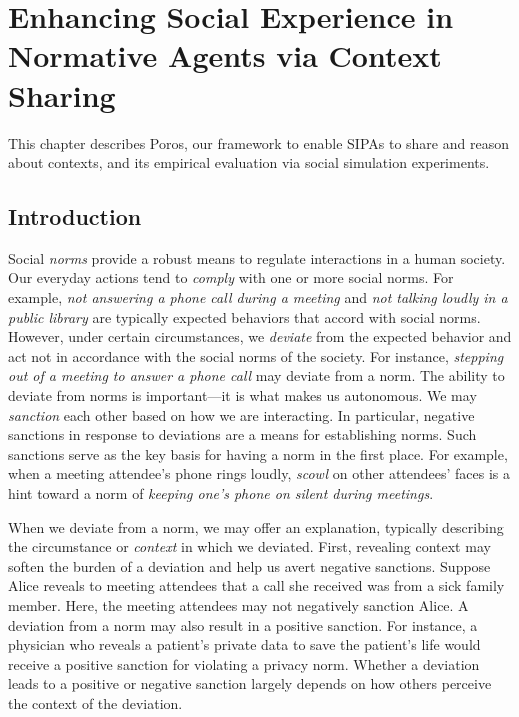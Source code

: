 \documentclass[11pt,          %
               phd,           %
               onehalfspacing %
               ]{ncsuthesis}
\newcommand{\fsl}{\textsl}
\newcommand{\frameworkB}{Poros\xspace}
\begin{document}
\chapter[Enhancing Social Experience via Context Sharing]{Enhancing Social Experience in Normative Agents via Context Sharing}
\label{chap:precious}

This chapter describes \frameworkB, our framework to enable SIPAs to
share and reason about contexts, and its empirical evaluation via social
simulation experiments.


\section{Introduction}
\label{sec:precious-intro}
Social \emph{norms} provide a robust means to regulate interactions in a
human society. Our everyday actions tend to \emph{comply} with one or
more social norms. For example, \fsl{not answering a phone call during a
meeting} and \fsl{not talking loudly in a public library} are typically
expected behaviors that accord with social norms. However, under certain
circumstances, we \emph{deviate} from the expected behavior and act not
in accordance with the social norms of the society. For instance,
\fsl{stepping out of a meeting to answer a phone call} may deviate from
a norm. The ability to deviate from norms is important---it is what
makes us autonomous. We may \emph{sanction} each other based on how we
are interacting. In particular, negative sanctions in response to
deviations are a means for establishing norms. Such sanctions serve as
the key basis for having a norm in the first place. For example, when a
meeting attendee's phone rings loudly, \fsl{scowl} on other attendees'
faces is a hint toward a norm of \fsl{keeping one's phone on silent
during meetings}.

When we deviate from a norm, we may offer an explanation, typically
describing the circumstance or \emph{context} in which we deviated.
First, revealing context may soften the burden of a deviation and help
us avert negative sanctions. Suppose Alice reveals to meeting attendees
that a call she received was from a sick family member. Here, the
meeting attendees may not negatively sanction Alice. A deviation from a
norm may also result in a positive sanction. For instance, a physician
who reveals a patient's private data to save the patient's life would
receive a positive sanction for violating a privacy norm. Whether a
deviation leads to a positive or negative sanction largely depends on
how others perceive the context of the deviation.
\end{document}
